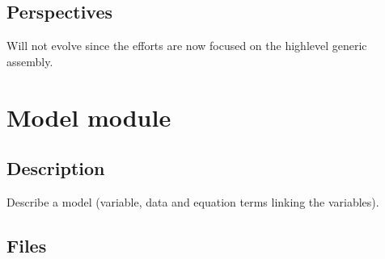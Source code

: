 \documentclass[a4paper,11pt,english]{sphinxmanual}
\begin{document}
\subsection{Perspectives}
\label{\detokenize{project/libdesc_low_gen_assemb:perspectives}}
Will not evolve since the efforts are now focused on the high\sphinxhyphen{}level generic assembly.


\section{Model module}
\label{\detokenize{project/libdesc_model:model-module}}\label{\detokenize{project/libdesc_model:dp-libdesc-model}}\label{\detokenize{project/libdesc_model::doc}}

\subsection{Description}
\label{\detokenize{project/libdesc_model:description}}
Describe a model (variable, data and equation terms linking the variables).


\subsection{Files}
\label{\detokenize{project/libdesc_model:files}}
\end{document}
